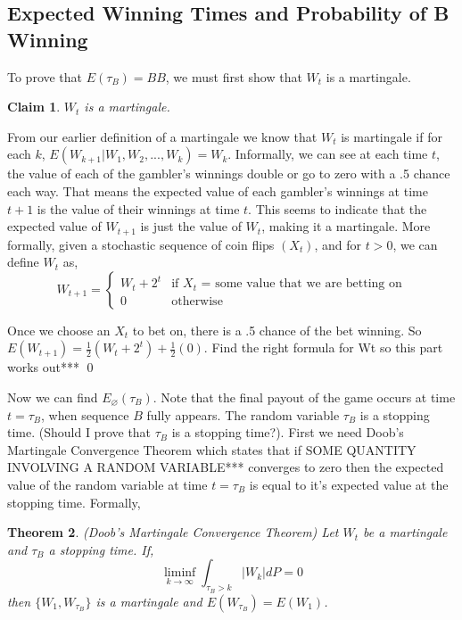 \documentclass{article}
\newtheorem{theorem}{Theorem}[section]
\newtheorem{claim}[theorem]{Claim}
\numberwithin{mytheorem}{subsection} %
\begin{document}
		\subsection{Expected Winning Times and Probability of B Winning}
		    To prove that $E(\tau_B) = BB$, we must first show that $W_t$ is a martingale.

			\begin{claim}
				$W_t$ is a martingale.
			\end{claim}

			\begin{PROOF}
				From our earlier definition of a martingale we know that $W_t$ is martingale if for each $k$, $E(W_{k+1} | W_1,W_2,...,W_k) = W_k$. Informally, we can see at each time $t$, the value of each of the gambler's winnings double or go to zero with a .5 chance each way. That means the expected value of each gambler's winnings at time $t+1$ is the value of their winnings at time $t$. This seems to indicate that the expected value of $W_{t+1}$ is just the value of $W_t$, making it a martingale. More formally, given a stochastic sequence of coin flips $(X_t)$, and for $t > 0$, we can define $W_t$ as, 
			    \[ W_{t+1}=\begin{cases} 
			      W_{t} + 2^t & \text{if $X_t$ = some value that we are betting on}\\
			      0 & \text{otherwise} 
				  \end{cases} \]

				 Once we choose an $X_t$ to bet on, there is a .5 chance of the bet winning. So $E(W_{t+1}) = \frac{1}{2}(W_t + 2^t) + \frac{1}{2}(0)$. Find the right formula for Wt so this part works out*** \qed
			\end{PROOF}

			Now we can find $E_{\varnothing}(\tau_{B})$. Note that the final payout of the game occurs at time $t=\tau_{B}$, when sequence $B$ fully appears. The random variable $\tau_B$ is a stopping time. (Should I prove that $\tau_{B}$ is a stopping time?). First we need Doob's Martingale Convergence Theorem which states that if SOME QUANTITY INVOLVING A RANDOM VARIABLE*** converges to zero then the expected value of the random variable at time $t=\tau_B$ is equal to it's expected value at the stopping time. Formally,

			\begin{theorem}(Doob's Martingale Convergence Theorem)
				Let $W_t$ be a martingale and $\tau_B$ a stopping time. If,
				$$\liminf\limits_{k\rightarrow \infty} \int_{\tau_B > k} |W_k|dP = 0$$
				then $\{W_1, W_{\tau_B}\}$ is a martingale and $E(W_{\tau_B}) = E(W_1)$.
			\end{theorem}
\end{document}
